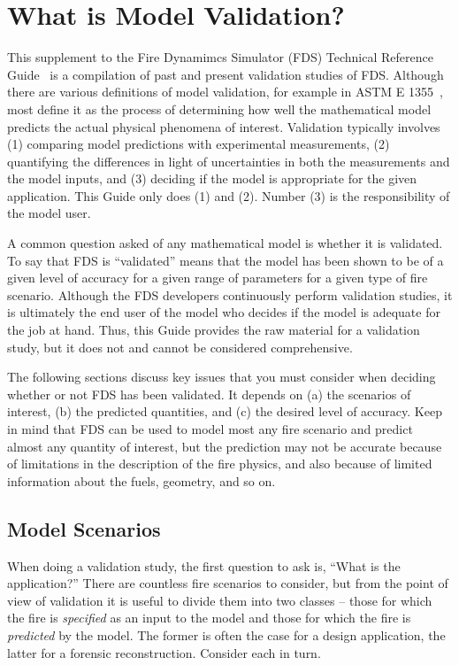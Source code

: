 
\chapter{What is Model Validation?}

This supplement to the Fire Dynamimcs Simulator (FDS) Technical Reference Guide~\cite{FDS_Tech_Guide_5}
is a compilation of past and present validation studies of FDS. Although there are various definitions of model validation, for example in
ASTM E 1355~\cite{ASTM:E1355}, most define it as the process of determining how well the mathematical model predicts the actual physical phenomena of
interest.
Validation typically involves (1) comparing model predictions with experimental measurements, (2) quantifying the differences in light of uncertainties in
both the measurements and the model inputs, and (3) deciding if the model is appropriate for the given application. This Guide only does (1) and (2). Number (3) is
the responsibility of the model user.

A common question asked of any mathematical model is whether it is validated. To say that FDS is
``validated'' means that the model has been shown to be of a given level of accuracy for a given range of parameters for a given
type of fire scenario. Although the FDS developers continuously perform validation studies, it is ultimately the end user of the model who
decides if the model is adequate for the job at hand. Thus, this Guide provides the raw material for a validation study, but it does not
and cannot be considered comprehensive.

The following sections discuss key issues that you must consider when deciding whether or not FDS has been validated. It depends on (a) the scenarios
of interest, (b) the predicted quantities, and (c) the desired level of accuracy. Keep in mind that FDS can be used to model most any fire scenario and predict almost
any quantity of interest, but the prediction may not be accurate because of limitations in the description of the fire physics, and also because of limited
information about the fuels, geometry, and so on.



\section{Model Scenarios}

When doing a validation study, the first question to ask is, ``What is the application?'' There are countless fire scenarios to consider, but from the
point of view of validation it is useful to divide them into two classes -- those for which the fire is {\em specified} as an input to the model and those for which the fire
is {\em predicted} by the model. The former is often the case for a design application, the latter for a forensic reconstruction. Consider each in turn.

